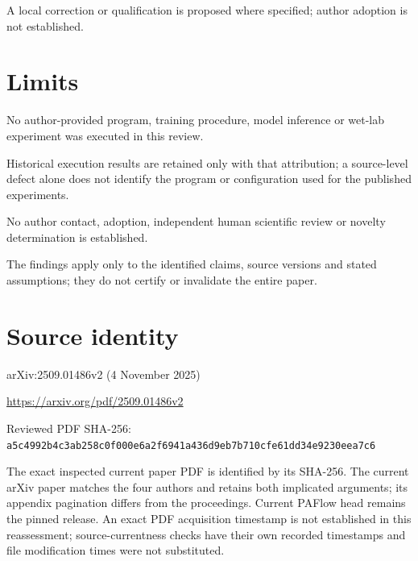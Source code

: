 \documentclass[11pt]{article}
\begin{document}
A local correction or qualification is proposed where specified; author adoption is not established.

\section*{Limits}

No author-provided program, training procedure, model inference or wet-lab experiment was executed in this review.\par

Historical execution results are retained only with that attribution; a source-level defect alone does not identify the program or configuration used for the published experiments.\par

No author contact, adoption, independent human scientific review or novelty determination is established.\par

The findings apply only to the identified claims, source versions and stated assumptions; they do not certify or invalidate the entire paper.\par

\section*{Source identity}

arXiv:2509.01486v2 (4 November 2025)

\url{https://arxiv.org/pdf/2509.01486v2}

Reviewed PDF SHA-256: \nolinkurl{a5c4992b4c3ab258c0f000e6a2f6941a436d9eb7b710cfe61dd34e9230eea7c6}

The exact inspected current paper PDF is identified by its SHA-256. The current arXiv paper matches the four authors and retains both implicated arguments; its appendix pagination differs from the proceedings. Current PAFlow head remains the pinned release. An exact PDF acquisition timestamp is not established in this reassessment; source-currentness checks have their own recorded timestamps and file modification times were not substituted.
\end{document}
